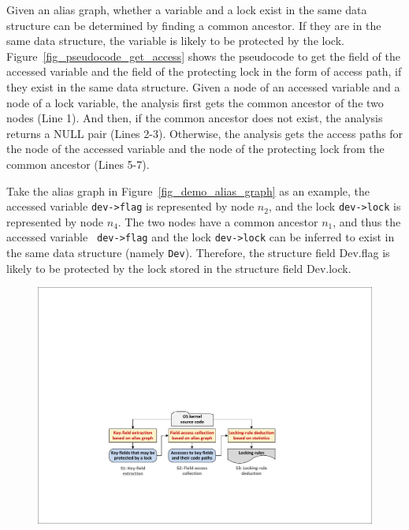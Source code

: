 Given an alias graph, whether a variable and a lock exist in the same data 
structure can be determined by finding a common ancestor. If they are in the 
same data structure, the variable is likely to be protected by the lock. 
Figure~\ref{fig_pseudocode_get_access} shows the pseudocode to 
get the field of the accessed variable and the field of the protecting lock in 
the form of access path, if they exist in the same data structure. Given a node 
of an accessed variable and a node of a lock variable, the analysis first gets 
the common ancestor of the two nodes (Line 1). And then, if the common ancestor 
does not exist, the analysis returns a NULL pair (Lines 2-3). Otherwise, the 
analysis gets the access paths for the node of the accessed variable and the 
node of the protecting lock from the common ancestor (Lines 5-7).

Take the alias graph in Figure~\ref{fig_demo_alias_graph} as an example, the 
accessed variable {\tt dev->flag} is represented by node $\mathit{n_2}$, and 
the lock {\tt dev->lock} is represented by node $\mathit{n_4}$. The two nodes 
have a common ancestor $\mathit{n_1}$, and thus the accessed variable {\tt 
dev->flag} and the lock {\tt dev->lock} can be inferred to exist in the same 
data structure (namely {\tt Dev}). Therefore, the structure field Dev.flag is 
likely to be protected by the lock stored in the structure field Dev.lock.

\begin{figure}[htbp]
	\centering
	\includegraphics[width=1\linewidth]{figures/fig_workflow.pdf}
	\label{fig_workflow}
\end{figure}

